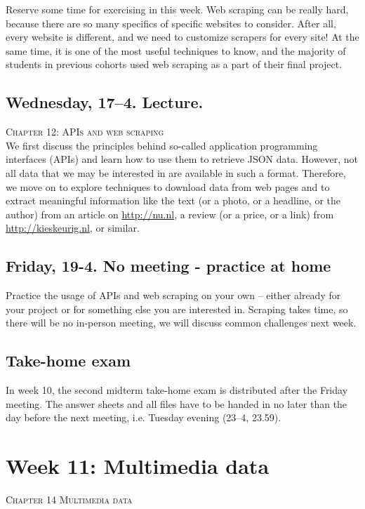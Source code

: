 Reserve some time for exercising in this week. Web scraping can be really hard, because there are so many specifics of specific websites to consider. After all, every website is different, and we need to customize scrapers for every site! At the same time, it is one of the most useful techniques to know, and the majority of students in previous cohorts used web scraping as a part of their final project.

\subsection*{Wednesday, 17--4. Lecture.}
\textsc{ Chapter 12: APIs and web scraping}\\

We first discuss the principles behind so-called application programming interfaces (APIs) and learn how to use them to retrieve JSON data. However, not all data that we may be interested in are available in such a format. Therefore, we move on to explore techniques to download data from web pages and to extract meaningful information like the text (or a photo, or a headline, or the author) from an article on \url{http://nu.nl}, a review (or a price, or a link) from \url{http://kieskeurig.nl}, or similar.



\subsection*{Friday, 19-4. No meeting - practice at home}

Practice the usage of APIs and web scraping on your own -- either already for your project or for something else you are interested in. Scraping takes time, so there will be no in-person meeting, we will discuss common challenges next week. 


\subsection*{Take-home exam}
In week 10, the second midterm take-home exam is distributed after the Friday meeting. The answer sheets and all files have to be handed in no later than the day before the next meeting, i.e. Tuesday evening (23--4, 23.59).






\section*{Week 11: Multimedia data}
\textsc{ Chapter 14 Multimedia data}\\

